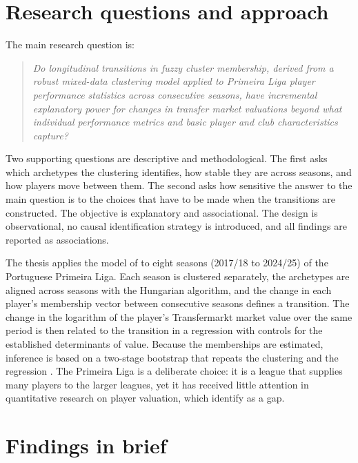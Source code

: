 \section{Research questions and approach}

The main research question is:
\begin{quote}
\emph{Do longitudinal transitions in fuzzy cluster membership, derived from a robust mixed-data clustering model applied to Primeira Liga player performance statistics across consecutive seasons, have incremental explanatory power for changes in transfer market valuations beyond what individual performance metrics and basic player and club characteristics capture?}
\end{quote}
Two supporting questions are descriptive and methodological. The first asks which archetypes the clustering identifies, how stable they are across seasons, and how players move between them. The second asks how sensitive the answer to the main question is to the choices that have to be made when the transitions are constructed. The objective is explanatory and associational. The design is observational, no causal identification strategy is introduced, and all findings are reported as associations.

The thesis applies the model of  to eight seasons (2017/18 to 2024/25) of the Portuguese Primeira Liga. Each season is clustered separately, the archetypes are aligned across seasons with the Hungarian algorithm, and the change in each player's membership vector between consecutive seasons defines a transition. The change in the logarithm of the player's Transfermarkt market value over the same period is then related to the transition in a regression with controls for the established determinants of value. Because the memberships are estimated, inference is based on a two-stage bootstrap that repeats the clustering and the regression \cite{pagan1984econometric}. The Primeira Liga is a deliberate choice: it is a league that supplies many players to the larger leagues, yet it has received little attention in quantitative research on player valuation, which  identify as a gap.

\section{Findings in brief}

